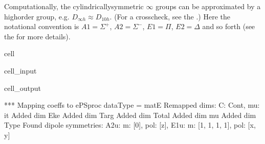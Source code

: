 \documentclass[letterpaper,table,10pt,english]{jupyterBook}
\begin{document}
\sphinxAtStartPar
Computationally, the cylindrically\sphinxhyphen{}symmetric \(\infty\) groups can be approximated by a high\sphinxhyphen{}order group, e.g. \(D_{\infty h} \approx D_{10h}\). (For a cross\sphinxhyphen{}check, see the .)  Here the notational convention is \(A1 = \Sigma^{+}\), \(A2 = \Sigma^{-}\), \(E1 = \Pi\), \(E2 = \Delta\) and so forth (see the  for more details).

\begin{sphinxuseclass}{cell}\begin{sphinxVerbatimInput}

\begin{sphinxuseclass}{cell_input}
\begin{sphinxVerbatim}[commandchars=\\\{\}]

   

  

  

\end{sphinxVerbatim}

\end{sphinxuseclass}\end{sphinxVerbatimInput}
\begin{sphinxVerbatimOutput}

\begin{sphinxuseclass}{cell_output}
\begin{sphinxVerbatim}[commandchars=\\\{\}]
*** Mapping coeffs to ePSproc dataType = matE
Remapped dims: \PYGZob{}\PYGZsq{}C\PYGZsq{}: \PYGZsq{}Cont\PYGZsq{}, \PYGZsq{}mu\PYGZsq{}: \PYGZsq{}it\PYGZsq{}\PYGZcb{}
Added dim Eke
Added dim Targ
Added dim Total
Added dim mu
Added dim Type
Found dipole symmetries: 
\PYGZob{}\PYGZsq{}A2u\PYGZsq{}: \PYGZob{}\PYGZsq{}m\PYGZsq{}: [0], \PYGZsq{}pol\PYGZsq{}: [\PYGZsq{}z\PYGZsq{}]\PYGZcb{}, \PYGZsq{}E1u\PYGZsq{}: \PYGZob{}\PYGZsq{}m\PYGZsq{}: [\PYGZhy{}1, 1, \PYGZhy{}1, 1], \PYGZsq{}pol\PYGZsq{}: [\PYGZsq{}x\PYGZsq{}, \PYGZsq{}y\PYGZsq{}]\PYGZcb{}\PYGZcb{}
\end{sphinxVerbatim}

\end{sphinxuseclass}\end{sphinxVerbatimOutput}

\end{sphinxuseclass}
\end{document}
